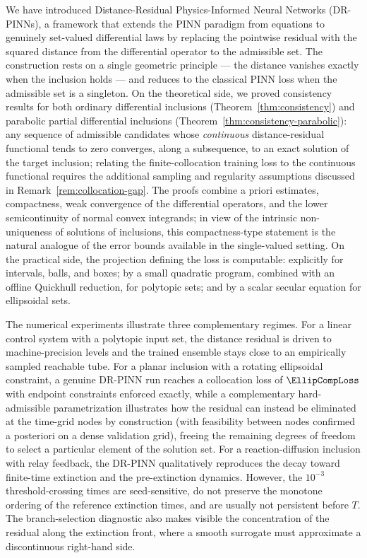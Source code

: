 \documentclass[11pt]{elsarticle}
\theoremstyle{definition}
\theoremstyle{remark}
\numberwithin{equation}{section}
\begin{document}
We have introduced Distance-Residual Physics-Informed Neural Networks
(DR-PINNs), a framework that extends the PINN paradigm from equations to
genuinely set-valued differential laws by replacing the pointwise residual
with the squared distance from the differential operator to the admissible
set. The construction rests on a single geometric principle --- the
distance vanishes exactly when the inclusion holds --- and reduces to the
classical PINN loss when the admissible set is a singleton. On the
theoretical side, we proved consistency results for both ordinary
differential inclusions (Theorem~\ref{thm:consistency}) and parabolic
partial differential inclusions
(Theorem~\ref{thm:consistency-parabolic}): any sequence of admissible
candidates whose \emph{continuous} distance-residual functional tends to
zero converges, along a subsequence, to an exact solution of the target
inclusion; relating the finite-collocation training loss to the continuous
functional requires the additional sampling and regularity assumptions
discussed in Remark~\ref{rem:collocation-gap}. The proofs
combine a priori estimates, compactness, weak convergence of the
differential operators, and the lower semicontinuity of normal convex
integrands; in view of the intrinsic non-uniqueness of solutions of
inclusions, this compactness-type statement is the natural analogue of
the error bounds available in the single-valued setting. On the practical
side, the projection defining the loss is computable: explicitly for
intervals, balls, and boxes; by a small quadratic program, combined with
an offline Quickhull reduction, for polytopic sets; and by a scalar
secular equation for ellipsoidal sets.

The numerical experiments illustrate three complementary regimes. For a
linear control system with a polytopic input set, the distance residual
is driven to machine-precision levels and the trained ensemble stays
close to an empirically sampled reachable tube. For a planar inclusion
with a rotating ellipsoidal constraint, a genuine DR-PINN run reaches
a collocation loss of $\EllipCompLoss$ with endpoint constraints enforced
exactly, while a complementary hard-admissible parametrization
illustrates how the residual can instead be eliminated at the time-grid
nodes by construction (with feasibility between nodes confirmed a
posteriori on a dense validation grid), freeing the remaining degrees of freedom to
select a particular element of the solution set. For a reaction-diffusion
inclusion with relay feedback, the DR-PINN qualitatively reproduces the
decay toward finite-time extinction and the pre-extinction dynamics.
However, the $10^{-3}$ threshold-crossing times are seed-sensitive, do not
preserve the monotone ordering of the reference extinction times,
and are usually not persistent before $T$.  The branch-selection diagnostic
also makes visible the concentration of the residual along the extinction
front, where a smooth surrogate must approximate a discontinuous
right-hand side.
\end{document}
